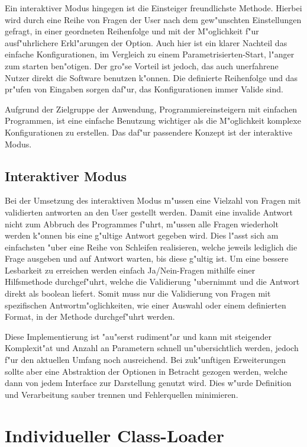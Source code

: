 Ein interaktiver Modus hingegen ist die Einsteiger freundlichste Methode. Hierbei wird durch eine Reihe von Fragen der User nach dem gew"unschten Einstellungen gefragt, in einer geordneten Reihenfolge und mit der M"oglichkeit f"ur ausf"uhrlichere Erkl"arungen der Option. Auch hier ist ein klarer Nachteil das einfache Konfigurationen, im Vergleich zu einem Parametrisierten-Start, l"anger zum starten ben"otigen. Der gro"se Vorteil ist jedoch, das auch unerfahrene Nutzer direkt die Software benutzen k"onnen. Die definierte Reihenfolge und das pr"ufen von Eingaben sorgen daf"ur, das Konfigurationen immer Valide sind.

Aufgrund der Zielgruppe der Anwendung, Programmiereinsteigern mit einfachen Programmen, ist eine einfache Benutzung wichtiger als die M"oglichkeit komplexe Konfigurationen zu erstellen. Das daf"ur passendere Konzept ist der interaktive Modus.

\subsection{Interaktiver Modus}

Bei der Umsetzung des interaktiven Modus m"ussen eine Vielzahl von Fragen mit validierten antworten an den User gestellt werden. Damit eine invalide Antwort nicht zum Abbruch des Programmes f"uhrt, m"ussen alle Fragen wiederholt werden k"onnen bis eine g"ultige Antwort gegeben wird. Dies l"asst sich am einfachsten "uber eine Reihe von Schleifen realisieren, welche jeweils lediglich die Frage ausgeben und auf Antwort warten, bis diese g"ultig ist. Um eine bessere Lesbarkeit zu erreichen werden einfach Ja/Nein-Fragen mithilfe einer Hilfsmethode durchgef"uhrt, welche die Validierung "ubernimmt und die Antwort direkt als boolean liefert. Somit muss nur die Validierung von Fragen mit spezifischen Antwortm"oglichkeiten, wie einer Auswahl oder einem definierten Format, in der Methode durchgef"uhrt werden.

Diese Implementierung ist "au"serst rudiment"ar und kann mit steigender Komplexit"at und Anzahl an Parametern schnell un"ubersichtlich werden, jedoch f"ur den aktuellen Umfang noch ausreichend.
Bei zuk"unftigen Erweiterungen sollte aber eine Abstraktion der Optionen in Betracht gezogen werden, welche dann von jedem Interface zur Darstellung genutzt wird. Dies w"urde Definition und Verarbeitung sauber trennen und Fehlerquellen minimieren.

\section{Individueller Class-Loader}

